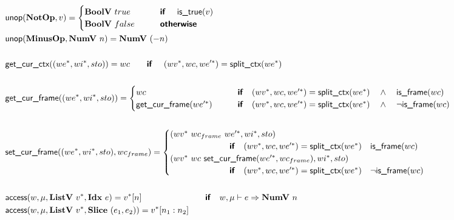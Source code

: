 \begin{align*}
  &\unop(\notop, v) =
    \begin{cases}
      \boolv ~ true &\quad\quad\premise{if}\quad ~ \istrue(v) \\
      \boolv ~ false &\quad\quad\premise{otherwise} \\
    \end{cases}
  \\
  &\unop(\minusop, \numv ~ n) = \numv ~ (-n) \\
%
\newline \\
  &\getcurctx((\seq{we}, \seq{wi}, sto)) =
  wc \quad\quad\premise{if}\quad ~ (\seq{wv}, wc, \seq{we'}) = \splitctx(\seq{we}) \\
%
\newline \\
  &\getcurframe((\seq{we}, \seq{wi}, sto)) =
    \begin{cases}
      wc &\quad\quad\premise{if}\quad
      (\seq{wv}, wc, \seq{we'}) = \splitctx(\seq{we}) \quad\land\quad \isframe(wc)\\
      \getcurframe(\seq{we'}) &\quad\quad\premise{if}\quad
      (\seq{wv}, wc, \seq{we'}) = \splitctx(\seq{we}) \quad\land\quad \neg \isframe(wc) \\
    \end{cases}
  \\
%
\newline \\
  &\setcurframe((\seq{we}, \seq{wi}, sto), wc_{frame})
  =
  \begin{cases}
    (\seq{wv} ~ wc_{frame} ~ \seq{we'}, \seq{wi}, sto) \\
    \qquad\qquad\qquad\quad\premise{if}\quad
    (\seq{wv}, wc, \seq{we'}) = \splitctx(\seq{we}) \quad \isframe(wc) \\
    (\seq{wv} ~ wc ~ \setcurframe(\seq{we'}, wc_{frame}), \seq{wi}, sto) \\
    \qquad\qquad\qquad\quad\premise{if}\quad
    (\seq{wv}, wc, \seq{we'}) = \splitctx(\seq{we}) \quad \neg \isframe(wc) \\
  \end{cases}
  \\
%
\newline \\
  &\access(w, \mu, \listv ~ \seq{v}, \idxp ~ e) = \seq{v}[n]
  \qquad\qquad\qquad~\,\quad\premise{if}\quad w, \mu \vdash e \Rightarrow \numv ~ n \\
  &\access(w, \mu, \listv ~ \seq{v}, \slicep ~ (e_1, e_2)) = \seq{v}[n_1: n_2]

\end{align*}
